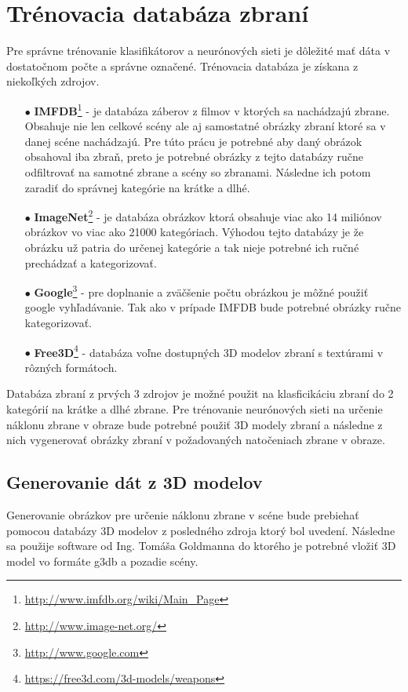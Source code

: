 
\section{Trénovacia databáza zbraní}
Pre správne trénovanie klasifikátorov a neurónových sieti je dôležité mať dáta v dostatočnom počte a správne označené.
Trénovacia databáza je získana z niekoľkých zdrojov.
\begin{enumerate}
    \item[$\bullet$] \textbf{IMFDB}\footnote{\url{http://www.imfdb.org/wiki/Main_Page}} - je databáza záberov z filmov v ktorých sa nachádzajú zbrane.
    Obsahuje nie len celkové scény ale aj samostatné obrázky zbraní ktoré sa v danej scéne nachádzajú.
    Pre túto prácu je potrebné aby daný obrázok obsahoval iba zbraň, preto je potrebné obrázky z tejto databázy ručne odfiltrovať na samotné zbrane a scény so zbranami.
    Následne ich potom zaradiť do správnej kategórie na krátke a dlhé.
    \item[$\bullet$] \textbf{ImageNet}\footnote{\url{http://www.image-net.org/}} - je databáza obrázkov ktorá obsahuje viac ako 14 miliónov obrázkov vo viac ako 21000 kategóriach.
    Výhodou tejto databázy je že obrázku už patria do určenej kategórie a tak nieje potrebné ich ručné prechádzať a kategorizovať.
    \item[$\bullet$] \textbf{Google}\footnote{\url{http://www.google.com}} - pre doplnanie a zväčšenie počtu obrázkou je môžné použiť google vyhľadávanie.
    Tak ako v prípade IMFDB bude potrebné obrázky ručne kategorizovať.
    \item[$\bullet$] \textbf{Free3D}\footnote{\url{https://free3d.com/3d-models/weapons}} - databáza voľne dostupných 3D modelov zbraní s textúrami v rôzných formátoch.
\end{enumerate}

Databáza zbraní z prvých 3 zdrojov je možné použit na klasficikáciu zbraní do 2 kategórií na krátke a dlhé zbrane.
Pre trénovanie neurónových sieti na určenie náklonu zbrane v obraze bude potrebné použiť 3D modely zbraní a následne z nich vygenerovať
    obrázky zbraní v požadovaných natočeniach zbrane v obraze.

\subsection{Generovanie dát z 3D modelov}
Generovanie obrázkov pre určenie náklonu zbrane v scéne bude prebiehať pomocou databázy 3D modelov z posledného zdroja ktorý bol uvedení.
Následne sa použije software od Ing. Tomáša Goldmanna do ktorého je potrebné vložiť 3D model vo formáte g3db a pozadie scény.

